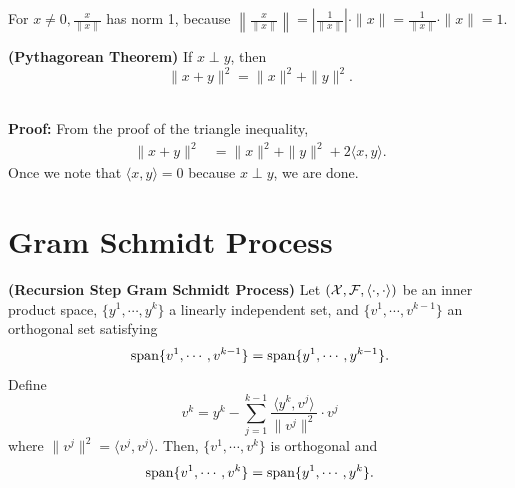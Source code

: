 \begin{rem}
 For $x \neq 0, \frac{x}{\|x\|}$ has norm 1, because 
    $\left \lVert \frac{x}{\|x\|}\right\rVert = \left| \frac{1}{\|x\|}\right| \cdot \|x\|=\frac{1}{\|x\|}\cdot \|x\|=1$.
\end{rem}

 \begin{thm}
     \textbf{(Pythagorean Theorem)} If $x \perp y$, then
    $$\|x+y\|^2 = \|x\|^2+ \|y\|^2.$$\\
 \end{thm}

\textbf{Proof:} From the proof of the triangle inequality,
    \begin{align*}
        \|x+y\|^2 &= \|x\|^2+ \|y\|^2+2 \langle x,y \rangle.
    \end{align*}
    Once we note that $ \langle x,y \rangle = 0$  because $ x \perp y$, we are done. 
    
\Qed

 
 \section{Gram Schmidt Process}
 
\begin{prop}
 \textbf{(Recursion Step Gram Schmidt Process)} Let $({\cal X, F}, \langle \cdot, \cdot \rangle  )$ be  an inner product space, $\{ y^1, \cdots, y^k\}$ a linearly independent set, and 
$\{ v^1, \cdots, v^{k-1} \}$ an orthogonal set satisfying
  \begin{equation}
 \label{eq:gramSchmidtStepkminus1}
 \mathrm{span} \{  v^1, \cdots, v^{k-1}  \} = \mathrm{span} \{  y^1, \cdots, y^{k-1}  \} .
  \end{equation}
 Define
 \begin{equation}
 \label{eq:gramSchmidtRecursion}
	v^k = y^k - \sum_{j=1}^{k-1}
	\frac{\langle y^k,v^j \rangle  }{\| v^j \|^2} \cdot v^j		
\end{equation}
where $ \| v^j \|^2 = \langle v^j,v^j \rangle  $. Then, $\{ v^1, \cdots, v^{k} \}$ is orthogonal and
 \begin{equation}
 \label{eq:gram_schmidt}
\mathrm{span} \{  v^1, \cdots, v^{k}  \} = \mathrm{span} \{ y^1, \cdots, y^{k} \}.
 \end{equation}

\end{prop}

